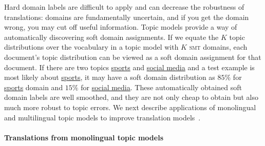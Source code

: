 Hard domain labels are difficult to apply and can decrease the robustness of translations: domains are fundamentally uncertain, and if you get the domain wrong, you may cut off useful information.
Topic models provide a way of automatically discovering soft domain
assignments. 
If we equate the $K$ topic distributions over the vocabulary in a topic model with $K$ 
\textsc{smt} domains, each document's topic distribution can be viewed as a soft
domain assignment for that document.
If there
are two topics \underline{sports} and \underline{social media} and
a test example is most likely about \underline{sports}, it may
have a soft domain distribution as $85\%$ for \underline{sports}
domain and $15\%$ for \underline{social media}. These automatically
obtained soft domain labels are well smoothed, and they are not only
cheap to obtain but also much more robust to topic errors. 
We next describe applications of monolingual and multilingual
topic models to improve translation models~\citep{Eidelman-12,hu-14}.





\paragraph{Translations from monolingual topic models}

